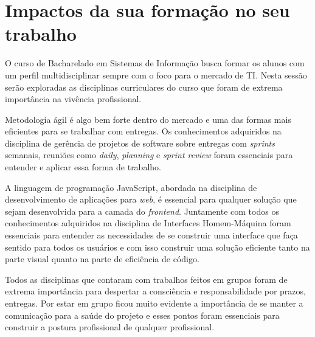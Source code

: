 \section{Impactos da sua formação no seu trabalho}
\label{sec:impactos}

{
O curso de Bacharelado em Sistemas de Informação busca formar os alunos com um perfil multidisciplinar sempre com o foco para o mercado de TI. Nesta sessão serão exploradas as disciplinas curriculares do curso que foram de extrema importância na vivência profissional.

Metodologia ágil é algo bem forte dentro do mercado e uma das formas mais eficientes para se trabalhar com entregas. Os conhecimentos adquiridos na disciplina de gerência de projetos de software sobre entregas com \textit{sprints} semanais,  reuniões como \textit{daily}, \textit{planning} e \textit{sprint review} foram essenciais para entender e aplicar essa forma de trabalho.

A linguagem de programação JavaScript, abordada na disciplina de desenvolvimento de aplicações para \textit{web}, é essencial para qualquer solução que sejam desenvolvida para a camada do \textit{frontend}. Juntamente com todos os conhecimentos adquiridos na disciplina de Interfaces Homem-Máquina foram essenciais para entender as necessidades de se construir uma interface que faça sentido para todos os usuários e com isso construir uma solução eficiente tanto na parte visual quanto na parte de eficiência de código.  

Todos as disciplinas que contaram com trabalhos feitos em grupos foram de extrema importância para despertar a consciência e responsabilidade por prazos, entregas. Por estar em grupo ficou muito evidente a importância de se manter a comunicação para a saúde do projeto e esses pontos foram essenciais para construir a postura profissional de qualquer profissional.
}